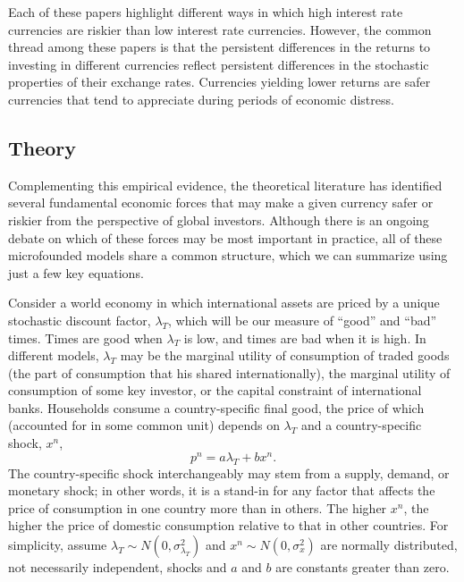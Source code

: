 \documentclass[12pt,letter]{article}
\theoremstyle{break} \theorembodyfont{\normalfont\itshape}
\theoremstyle{break}
\theoremstyle{break} \theorembodyfont{\normalfont\itshape}
\theoremstyle{break} \theorembodyfont{\normalfont\itshape}
\begin{document}
Each of these papers highlight different ways in which high interest rate currencies are riskier than low interest rate currencies. However, the 
common thread among these papers is that the persistent differences in the 
returns to investing in different currencies reflect persistent differences in the stochastic properties of their exchange rates. 
Currencies yielding lower returns are safer currencies that tend to 
appreciate during periods of economic distress. 

\subsection{Theory}

Complementing this empirical evidence, the theoretical literature has identified several fundamental economic forces that may make a given currency safer or riskier from the perspective of global investors. Although there is an ongoing debate on which of these forces may be most important in practice, all of these microfounded models share a common structure, which we can summarize using just a few key equations.

Consider a world economy in which international assets
are priced by a unique stochastic discount factor, $\lambda_T$, which will be our measure of ``good'' and ``bad'' times. Times are good when $\lambda_T$ is low, and times are bad when it is high. In different models, $\lambda_T$ may be the marginal utility of consumption of traded goods (the part of consumption that his shared internationally), the marginal utility of consumption of some key investor, or the capital constraint of international banks. 
Households consume a country-specific final good, the price of which (accounted for in
some common unit) depends on $\lambda_T$ and a country-specific shock,
$x^n$,
\begin{equation}
  p^{n}=a\lambda _{T}+b x^{n}.  \label{eq_RF}
\end{equation}%
The country-specific shock
interchangeably may stem from a supply, demand, or monetary shock; in
other words, it is a stand-in for any factor that affects the price of
consumption in one country more than in others. The higher $x^{n}$,
the higher the price of domestic consumption relative to that in other countries. 
For simplicity, assume $\lambda _{T}\sim N(0,\sigma^2_{\lambda_{T}})$ and
$x^{n} \sim N(0,\sigma^2_x) $ are normally distributed, not
necessarily independent, shocks and $a$ and $b$ are constants greater
than zero.
\end{document}
